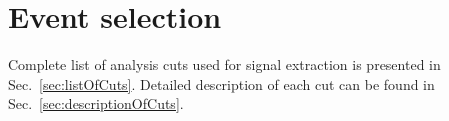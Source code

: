

\newcommand{\itemm}{\item\hspace*{-5pt}.\hspace*{-1pt}~}

\chapter{Event selection}\label{chap:eventSelection}

Complete list of analysis cuts used for signal extraction is presented in Sec.~\ref{sec:listOfCuts}. Detailed description of each cut can be found in Sec.~\ref{sec:descriptionOfCuts}.

